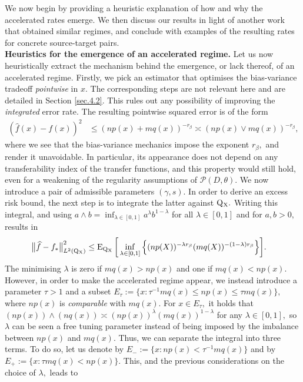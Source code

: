 \documentclass[10pt]{article}
\newcommand{\mP}{\mathcal{P}}
\newcommand{\E}{\operatorname{E}}
\newcommand{\Q}{\operatorname{Q}}
\newcommand{\wh}{\widehat}
\newcommand{\sX}{\mathrm{X}}
\begin{document}
We now begin by providing a heuristic explanation of how and why the accelerated rates emerge. We then discuss our results in light of another work that obtained similar regimes, and conclude with examples of the resulting rates for concrete source-target pairs.\\

\noindent\textbf{Heuristics for the emergence of an accelerated regime.} Let us now heuristically extract the mechanism behind the emergence, or lack thereof, of an accelerated regime. Firstly, we pick an estimator that optimises the bias-variance tradeoff \textit{pointwise} in $x.$ The corresponding steps are not relevant here and are detailed in Section \ref{sec.4.2}. This rules out any possibility of improving the \textit{integrated} error rate. The resulting pointwise squared error is of the form
\begin{align*}
    (\wh f(x) - f(x))^2 &\leq (np(x) + mq(x))^{-r_\beta} \asymp (np(x) \vee mq(x))^{-r_\beta},
\end{align*}
where we see that the bias-variance mechanics impose the exponent $r_\beta,$ and render it unavoidable. In particular, its appearance does not depend on any transferability index of the transfer functions, and this property would still hold, even for a weakening of the regularity assumptions of $\mP(D, \theta).$ We now introduce a pair of admissible parameters $(\gamma, s).$ In order to derive an excess risk bound, the next step is to integrate the latter against $\Q\mathstrut_{\!\sX}.$ Writing this integral, and using $a \wedge b = \inf_{\lambda \in [0, 1]} a^\lambda b^{1-\lambda}$ for all $\lambda \in [0, 1]$ and for $a, b > 0,$ results in
\begin{align}
    \label{eq.geom.interp.inside.E}
    \big\|\wh f - f_*\big\|_{L^2(\Q\mathstrut_{\!\sX})}^2 &\leq \E_{\Q\mathstrut_{\!\sX}}\bigg[\inf_{\lambda \in [0, 1]}\Big\{(np(X))^{-\lambda r_\beta} (mq(X))^{-(1 - \lambda)r_\beta}\Big\}\bigg].
\end{align}
The minimising $\lambda$ is zero if $mq(x) > np(x)$ and one if $mq(x) < np(x).$ However, in order to make the accelerated regime appear, we instead introduce a parameter $\tau > 1$ and a subset $E_\tau := \{x: \tau^{-1}mq(x) \leq np(x) \leq \tau mq(x)\},$ where $np(x)$ is \textit{comparable} with $mq(x).$ For $x \in E_\tau,$ it holds that $(np(x))\wedge (nq(x)) \asymp (np(x))^{\lambda}(mq(x))^{1-\lambda}$ for any $\lambda \in [0, 1],$ so $\lambda$ can be seen a free tuning parameter instead of being imposed by the imbalance between $np(x)$ and $mq(x).$ Thus, we can separate the integral into three terms. To do so, let us denote by $E_- := \{x: np(x) < \tau^{-1}mq(x)\}$ and by $E_+ := \{x: \tau mq(x) < np(x)\}.$ This, and the previous considerations on the choice of $\lambda,$ leads to
\end{document}
